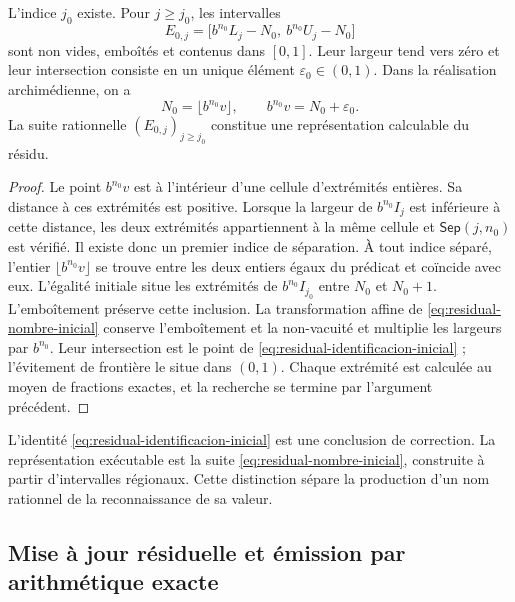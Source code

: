 \begin{theorem}
\label{thm:residual-inicializacion}
L'indice \(j_0\) existe. Pour \(j\geq j_0\), les intervalles
\begin{equation}
 E_{0,j}=
 \bigl[b^{n_0}L_j-N_0,\ b^{n_0}U_j-N_0\bigr]
 \label{eq:residual-nombre-inicial}
\end{equation}
sont non vides, emboîtés et contenus dans \([0,1]\). Leur largeur tend vers
zéro et leur intersection consiste en un unique élément
\(\varepsilon_0\in(0,1)\). Dans la réalisation archimédienne, on a
\begin{equation}
 N_0=\lfloor b^{n_0}v\rfloor,
 \qquad b^{n_0}v=N_0+\varepsilon_0.
 \label{eq:residual-identificacion-inicial}
\end{equation}
La suite rationnelle \((E_{0,j})_{j\geq j_0}\) constitue une
représentation calculable du résidu.
\end{theorem}
\begin{proof}
Le point \(b^{n_0}v\) est à l'intérieur d'une cellule d'extrémités
entières. Sa distance à ces extrémités est positive. Lorsque la largeur de
\(b^{n_0}I_j\) est inférieure à cette distance, les deux extrémités appartiennent à la
même cellule et \(\mathsf{Sep}(j,n_0)\) est vérifié. Il existe donc un
premier indice de séparation. À tout indice séparé, l'entier
\(\lfloor b^{n_0}v\rfloor\) se trouve entre les deux entiers égaux
du prédicat et coïncide avec eux. L'égalité initiale situe les extrémités
de \(b^{n_0}I_{j_0}\) entre \(N_0\) et \(N_0+1\). L'emboîtement
préserve cette inclusion. La transformation affine de
\eqref{eq:residual-nombre-inicial} conserve l'emboîtement et la non-vacuité et
multiplie les largeurs par \(b^{n_0}\). Leur intersection est le point de
\eqref{eq:residual-identificacion-inicial} ; l'évitement de frontière le
situe dans \((0,1)\). Chaque extrémité est calculée au moyen de fractions exactes,
et la recherche se termine par l'argument précédent.
\end{proof}

L'identité \eqref{eq:residual-identificacion-inicial} est une conclusion
de correction. La représentation exécutable est la suite
\eqref{eq:residual-nombre-inicial}, construite à partir d'intervalles
régionaux. Cette distinction sépare la production d'un nom rationnel de la
reconnaissance de sa valeur.

\subsection{Mise à jour résiduelle et émission par arithmétique exacte}
\label{subsec:residual-actualizacion}

